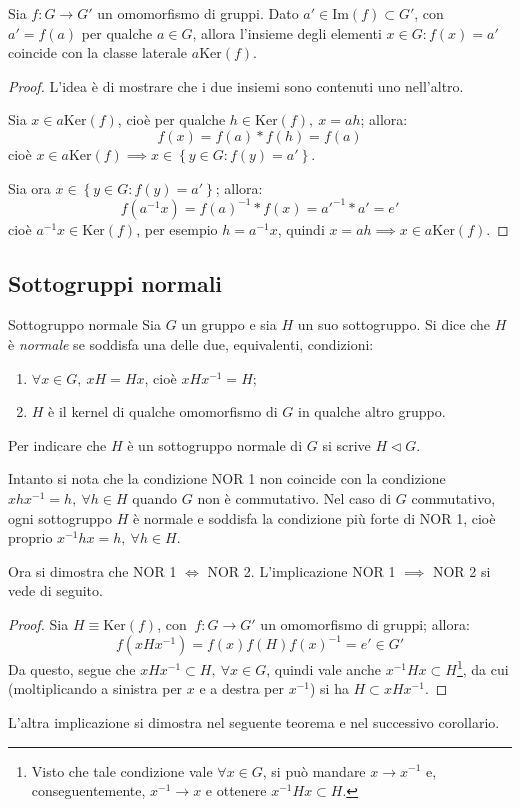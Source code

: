 \documentclass[11pt, a4paper]{scrartcl}
\theoremstyle{definition}
\numberwithin{esempio}{section}
\theoremstyle{definition}
\numberwithin{obs}{section}
\numberwithin{nota}{section}
\numberwithin{equation}{subsection}
\begin{document}
\begin{teorema}
	{}{}
	Sia $f : G \to G'$ un omomorfismo di gruppi. Dato $a' \in \mathrm{Im} (f) \subset G'$, con $a'= f(a)$ per qualche $ a \in G$, allora l'insieme degli elementi $x \in G : f(x ) = a'$ coincide con la classe laterale $a  \mathrm{Ker} (f)$.
	\begin{proof}
L'idea \`e di mostrare che i due insiemi sono contenuti uno nell'altro.

Sia $x \in a\mathrm{Ker} (f)$, cio\`e per qualche $h \in \mathrm{Ker} (f), \ x = ah$; allora:
\[
f(x) = f(a) *  f(h) = f(a)
\] 
cio\`e $x \in a \mathrm{Ker} (f) \implies x \in \left\{ y \in G : f(y) = a' \right\} $.

Sia ora $x \in \left\{ y \in G : f(y) = a' \right\} $; allora:
\[
	f(a^{-1} x) = f(a) ^{-1}*  f(x)  = a'^{-1} * a'= e'
\] 
cio\`e $a^{-1} x \in \mathrm{Ker} (f)$, per esempio $h = a^{-1} x$, quindi $x = ah\implies x \in a \mathrm{Ker} (f)$.
	\end{proof}
\end{teorema}

\subsection{Sottogruppi normali}
\begin{definizione}
	{Sottogruppo normale}{}
	Sia $G$ un gruppo e sia $H$ un suo sottogruppo. Si dice che $H $ \`e \textit{normale} se soddisfa una delle due, equivalenti, condizioni:
	\begin{enumerate}[NOR 1.]
		\item $\forall x \in G, \ xH = Hx$, cio\`e $xHx^{-1} = H$;
		\item $H$ \`e il kernel di qualche omomorfismo di $G$ in qualche altro gruppo.
	\end{enumerate}
	Per indicare che $H$ \`e un sottogruppo normale di $G$ si scrive $H \lhd G$.
\end{definizione}
\noindent Intanto si nota che la condizione NOR 1 non coincide con la condizione $x h x^{-1} = h, \ \forall h \in H$ quando $G$ non \`e commutativo.
Nel caso di $G$ commutativo, ogni sottogruppo $H$ \`e normale e soddisfa la condizione pi\`u forte di NOR 1, cio\`e proprio $x^{-1} h x = h, \ \forall h \in H$.

Ora si dimostra che NOR 1 $\iff$ NOR 2. L'implicazione NOR 1 $\implies$ NOR 2 si vede di seguito.
\begin{proof}
	Sia $H\equiv \mathrm{Ker} (f)$, con $ \ f: G \to G'$ un omomorfismo di gruppi; allora:
	\[
	f(xHx^{-1} ) = f(x) f(H) f(x) ^{-1} = e' \in G'
	\] 
	Da questo, segue che $x H x^{-1} \subset H, \ \forall x \in G$, quindi vale anche $x^{-1} H x \subset H$\footnote{Visto che tale condizione vale $\forall x \in G$, si pu\`o mandare $x\to x^{-1} $ e, conseguentemente, $x^{-1} \to x$ e ottenere $x^{-1} Hx \subset H$.}, da cui (moltiplicando a sinistra per $x$ e a destra per $x^{-1} $) si ha $H \subset x H x^{-1} $.
\end{proof}
L'altra implicazione si dimostra nel seguente teorema e nel successivo corollario.
\end{document}
